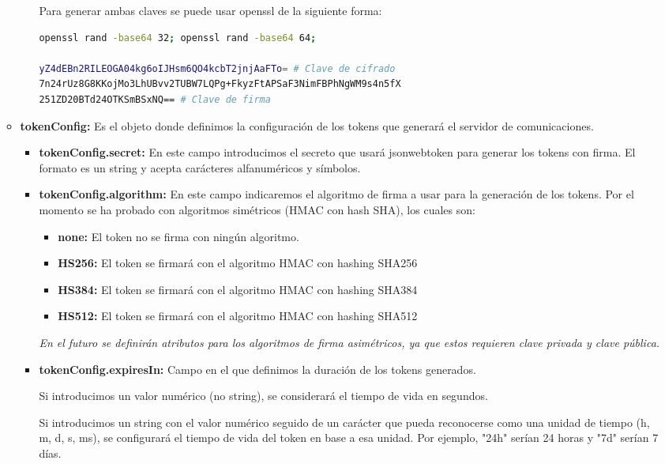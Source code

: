 \documentclass[spanish,12pt, a4paper, twoside]{paper}
\begin{document}
\begin{enumerate}
\begin{itemize}
\begin{itemize}
Para generar ambas claves se puede usar openssl de la siguiente forma:
\begin{lstlisting}[language=sh]
openssl rand -base64 32; openssl rand -base64 64;

yZ4dEBn2RILEOGA04kg6oIJHsm6QO4kcbT2jnjAaFTo= # Clave de cifrado
7n24rUz8G8KKojMo3LhUBvv2TUBW7LQPg+FkyzFtAPSaF3NimFBPhNgWM9s4n5fX
251ZD20BTd24OTKSmBSxNQ== # Clave de firma
\end{lstlisting}
\end{itemize}

\item\textbf{tokenConfig:} Es el objeto donde definimos la configuración de los tokens que generará el servidor de comunicaciones.

\begin{itemize}
\item\textbf{tokenConfig.secret:} En este campo introducimos el secreto que usará jsonwebtoken para generar los tokens con firma. El formato es un string y acepta carácteres alfanuméricos y símbolos.

\item\textbf{tokenConfig.algorithm:} En este campo indicaremos el algoritmo de firma a usar para la generación de los tokens. Por el momento se ha probado con algoritmos simétricos (HMAC con hash SHA), los cuales son:
\begin{itemize}
\item\textbf{none:} El token no se firma con ningún algoritmo.
\item\textbf{HS256:} El token se firmará con el algoritmo HMAC con hashing SHA256
\item\textbf{HS384:} El token se firmará con el algoritmo HMAC con hashing SHA384
\item\textbf{HS512:} El token se firmará con el algoritmo HMAC con hashing SHA512
\end{itemize}

\emph{En el futuro se definirán atributos para los algoritmos de firma asimétricos, ya que estos requieren clave privada y clave pública.}

\item\textbf{tokenConfig.expiresIn:} Campo en el que definimos la duración de los tokens generados. 

Si introducimos un valor numérico (no string), se considerará el tiempo de vida en segundos. 

Si introducimos un string con el valor numérico seguido de un carácter que pueda reconocerse como una unidad de tiempo (h, m, d, s, ms), se configurará el tiempo de vida del token en base a esa unidad. Por ejemplo, "24h" serían 24 horas y "7d" serían 7 días. 


\end{itemize}
\end{itemize}
\end{enumerate}
\end{document}
